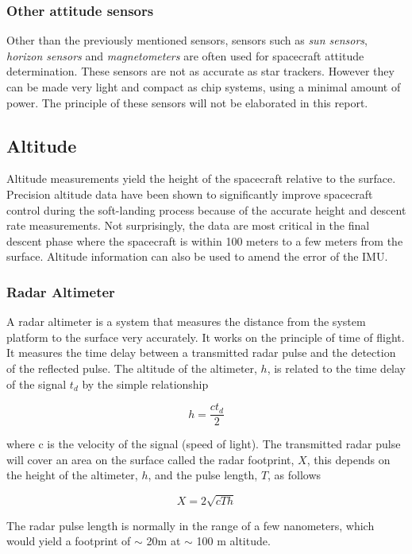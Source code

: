 \subsubsection{Other attitude sensors}
Other than the previously mentioned sensors, sensors such as \textit{sun sensors}, \textit{horizon sensors} and \textit{magnetometers} are often used for spacecraft attitude determination. These sensors are not as accurate as star trackers. However they can be made very light and compact as chip systems, using a minimal amount of power. The principle of these sensors will not be elaborated in this report. 


\subsection{Altitude}
Altitude measurements yield the height of the spacecraft relative to the surface. Precision altitude data have been shown to significantly improve spacecraft control during the soft-landing process because of the accurate height and descent rate measurements. Not surprisingly, the data are most critical in the final descent phase where the spacecraft is within 100 meters to a few meters from the surface. Altitude information can also be used to amend the error of the IMU. 


\subsubsection{Radar Altimeter}
A radar altimeter is a system that measures the distance from the system platform to the surface very accurately. It works on the principle of time of flight. It measures the time delay between a transmitted radar pulse and the detection of the reflected pulse. The altitude of the altimeter, $h$, is related to the time delay of the signal $t_d$ by the simple relationship 

\begin{equation}
h=\dfrac{c t_d}{2}
\end{equation}

where c is the velocity of the signal (speed of light)\cite{henningalt}. The transmitted radar pulse will cover an area on the surface called the radar footprint, $X$, this depends on the height of the altimeter, $h$, and the pulse length, $T$, as follows 

\begin{equation}
X=2\sqrt{cTh}
\end{equation}

The radar pulse length is normally in the range of a few nanometers, which would yield a footprint of $\sim$ 20m at $\sim$ 100 m altitude.


